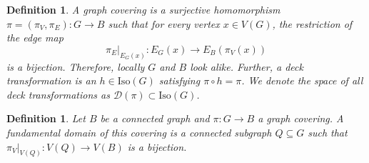 \documentclass{article}
\newtheorem{definition}[theorem]{Definition}
\newcommand{\Iso}{\mathrm{Iso}}
\begin{document}
\begin{definition}
    A graph covering is a surjective homomorphism $\pi = (\pi_V, \pi_E): G \to B$ such that for every vertex $x \in V(G)$, the restriction of the edge map
    \begin{equation}
        \pi_E\big|_{E_G(x)}: E_G(x) \to E_B(\pi_V(x))
    \end{equation}
    is a bijection. Therefore, locally $G$ and $B$ look alike. Further, a deck transformation is an $h \in \Iso(G)$ satisfying $\pi \circ h = \pi$. We denote the space of all deck transformations as $\mathcal{D}(\pi) \subset \Iso(G)$.
\end{definition}

\begin{definition}
    Let $B$ be a connected graph and $\pi:G\to B$ a graph covering. A fundamental domain of this covering is a connected subgraph $Q\subseteq G$ such that $\pi_V|_{V(Q)}:V(Q)\to V(B)$ is a bijection.
\end{definition}
\end{document}
